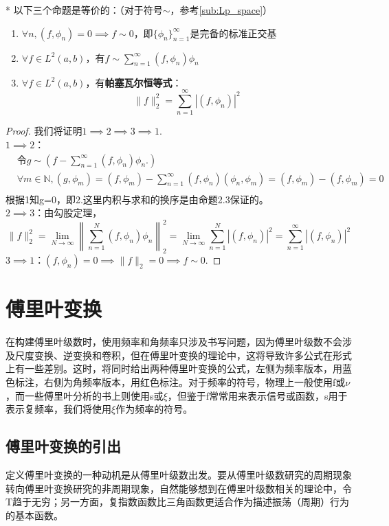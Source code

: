 \documentclass{ctexbook}
\begin{document}
\begin{theorem}*
以下三个命题是等价的：（对于符号$\sim$，参考\ref{sub:Lp_space}）
\begin{enumerate}
    \item $\forall n,(f,\phi_n)=0\implies f\sim 0$，即$\{\phi_n\}_{n=1}^{\infty}$是完备的标准正交基
    \item $\forall f\in L^2(a,b)$，有$f\sim\sum_{n=1}^{\infty}(f,\phi_n)\phi_n$
    \item $\forall f\in L^2(a,b)$，有\textbf{帕塞瓦尔恒等式}：
          \[\|f\|_2^2=\sum_{n=1}^{\infty}|(f,\phi_n)|^2\]
\end{enumerate}
\end{theorem}
\begin{proof}
我们将证明$1\implies 2\implies 3\implies 1$.\\
$1\implies 2$：\begin{align*}
     & \text{令}g\sim \left(f-\sum_{n=1}^{\infty}(f,\phi_n)\phi_n.\right)                                                              \\
     & \forall m\in\mathbb{N},\left(g,\phi_m\right)=\left(f,\phi_m\right)-\sum_{n=1}^{\infty}\left(f,\phi_n\right)\left(\phi_n,\phi_m\right)=\left(f,\phi_m\right)-\left(f,\phi_m\right)=0 \\
\end{align*}
根据1知g=0，即2.这里内积与求和的换序是由命题2.3保证的。\\
$2\implies 3$：由勾股定理，
\[\|f\|_2^2=\lim_{N\to\infty}\left\|\sum_{n=1}^{N}(f,\phi_n)\phi_n\right\|_2^2=\lim_{N\to\infty}\sum_{n=1}^{N}|(f,\phi_n)|^2=\sum_{n=1}^{\infty}|(f,\phi_n)|^2\]
$3\implies 1$：$(f,\phi_n)=0\implies\|f\|_2=0\implies f\sim 0$.
\end{proof}

\section{傅里叶变换}\label{sec:Fourier}

在构建傅里叶级数时，使用频率和角频率只涉及书写问题，因为傅里叶级数不会涉及尺度变换、逆变换和卷积，但在傅里叶变换的理论中，这将导致许多公式在形式上有一些差别。这时，将同时给出两种傅里叶变换的公式，左侧为频率版本，用蓝色标注，右侧为角频率版本，用红色标注。对于频率的符号，物理上一般使用f或$\nu $，而一些傅里叶分析的书上则使用s或$\xi$，但鉴于f常常用来表示信号或函数，s用于表示复频率，我们将使用$\xi$作为频率的符号。

\subsection{傅里叶变换的引出}\label{sub:introduction_of_fourier}
定义傅里叶变换的一种动机是从傅里叶级数出发。要从傅里叶级数研究的周期现象转向傅里叶变换研究的非周期现象，自然能够想到在傅里叶级数相关的理论中，令T趋于无穷；另一方面，复指数函数比三角函数更适合作为描述振荡（周期）行为的基本函数。
\end{document}
